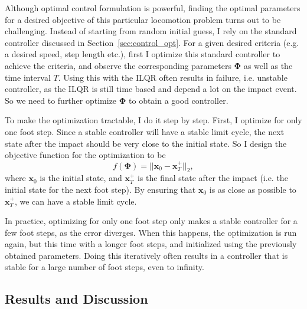 Although optimal control formulation is powerful, finding the optimal parameters for a desired objective of this particular locomotion problem turns out to be challenging. Instead of starting from random initial guess, I rely on the standard controller discussed in Section~\ref{sec:control_opt}. For a given desired criteria (e.g. a desired speed, step length etc.), first I optimize this standard controller to achieve the criteria, and observe the corresponding parameters $\bm{\Phi}$ as well as the time interval $T$. Using this with the ILQR often results in failure, i.e. unstable controller, as the ILQR is still time based and depend a lot on the impact event. So we need to further optimize $\bm{\Phi}$ to obtain a good controller.

To make the optimization tractable, I do it step by step. First, I optimize for only one foot step. Since a stable controller will have a stable limit cycle, the next state after the impact should be very close to the initial state. So I design the objective function for the optimization to be 
\begin{equation}
f(\bm{\Phi}) = ||\bm{x}_0 - \bm{x}_T^+ ||_2,
\end{equation}
where $\bm{x}_0$ is the initial state, and $\bm{x}_T^+$ is the final state after the impact (i.e. the initial state for the next foot step). By ensuring that $\bm{x}_0$ is as close as possible to $\bm{x}_T^+$, we can have a stable limit cycle. 

In practice, optimizing for only one foot step only makes a stable controller for a few foot steps, as the error diverges. When this happens, the optimization is run again, but this time with a longer foot steps, and initialized using the previously obtained parameters. Doing this iteratively often results in a controller that is stable for a large number of foot steps, even to infinity. 

\subsection{Results and Discussion}
\label{sec:results}

